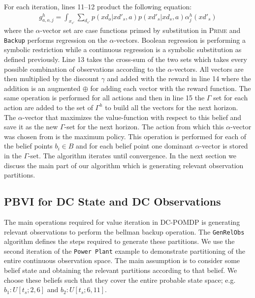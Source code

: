 \documentclass{article} %
\begin{document}
For each iteration, lines 11--12 product the following equation: 
{\footnotesize
\begin{align}
g^h_{a,o,j} =  \int_{x_{s'}} \sum_{d_{s'}} p(xd_o|xd'_s,a)p(xd'_s|xd_s,a) \alpha^h_j(xd'_s) \nonumber
\end{align}
}
where the $\alpha$-vector set are case functions primed by substitution in \textsc{Prime} 
and \texttt{Backup} performs regression on the $\alpha$-vectors. Boolean regression is performing a symbolic restriction while a continuous regression is a symbolic substitution as defined previously. 
Line 13 takes the cross-sum of the two sets which takes every possible combination of observations according to the $\alpha$-vectors. 
All vectors are then multiplied by the discount $\gamma$ and added with the reward in line 14 where the addition is an augmented $\oplus$ for adding each vector with the reward function. 
The same operation is performed for all actions and then in line 15 the $\Gamma$ set for each action are added to the set of $\Gamma^h$ to build all the vectors for the next horizon. 
The $\alpha$-vector that maximizes the value-function with respect to this belief and save it as the new $\Gamma$-set for the next horizon. The action from which this $\alpha$-vector was chosen from is the maximum policy. 
This operation is performed for each of the belief points $b_i \in B$ and for each belief point one dominant $\alpha$-vector is stored in the $\Gamma$-set. The algorithm iterates until convergence. 
In the next section we discuss the main part of our algorithm which is generating relevant observation partitions.

\subsection{PBVI for DC State and DC Observations} 
The main operations required for value iteration in DC-POMDP is generating relevant observations to perform the bellman backup operation. 
The \texttt{GenRelObs} algorithm defines the steps required to generate these partitions. 
We use the second iteration of the \texttt{Power Plant} example to demonstrate partitioning of the entire continuous observation space. The main assumption is to consider some belief state and obtaining the relevant partitions according to that belief. We choose these beliefs such that they cover the entire probable state space; e.g. $b_1: U[t_s;2,6]$ and $b_2: U[t_s;6,11]$.
\end{document}

